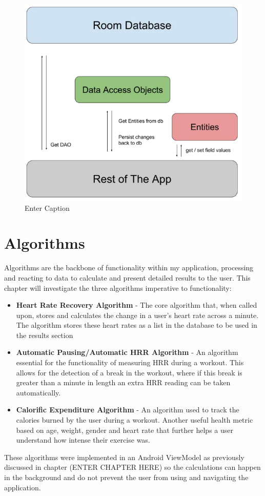 \documentclass{l4proj}
\begin{document}
\begin{figure}[h]
    \centering
    \includegraphics[width=0.5\linewidth]{dissertation//dissImages/RoomDatabaseStructure.png}
    \caption{Enter Caption}
    \label{fig:enter-label}
\end{figure}

\section{Algorithms}
\label{sec:algorithms}

Algorithms are the backbone of functionality within my application, processing and reacting to data to calculate and present detailed results to the user. This chapter will investigate the three algorithms imperative to functionality:

\begin{itemize}
    \item \textbf{Heart Rate Recovery Algorithm} - The core algorithm that, when called upon, stores and calculates the change in a user’s heart rate across a minute. The algorithm stores these heart rates as a list in the database to be used in the results section
    \item \textbf{Automatic Pausing/Automatic HRR Algorithm} - An algorithm essential for the functionality of measuring HRR during a workout. This allows for the detection of a break in the workout, where if this break is greater than a minute in length an extra HRR reading can be taken automatically.
    \item \textbf{Calorific Expenditure Algorithm} - An algorithm used to track the calories burned by the user during a workout. Another useful health metric based on age, weight, gender and heart rate that further helps a user understand how intense their exercise was.
\end{itemize}

These algorithms were implemented in an Android ViewModel as previously discussed in chapter (ENTER CHAPTER HERE) so the calculations can happen in the background and do not prevent the user from using and navigating the application.
\end{document}
